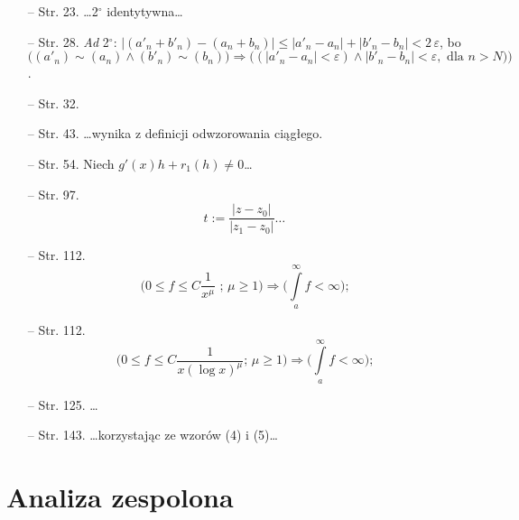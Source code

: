 \documentclass[a4paper,11pt]{article}
\begin{document}
\begin{itemize}
\item[--] Str. 23. \ldots 2$^{ \circ }$ identytywna\ldots
\item[--] Str. 28. \emph{Ad} 2$^{ \circ }$: $| ( a'_{ n } + b'_{ n } ) - ( a_{ n } + b_{ n } ) |  \leq | a'_{ n } - a_{ n } | + | b'_{ n } - b_{ n } | <2 \, \varepsilon$, bo\\
  $\big( ( a'_{ n } ) \sim ( a_{ n } ) \wedge( b'_{ n } ) \sim ( b_{ n
  } ) \big) \Rightarrow \big( ( | a'_{ n } - a_{ n } | < \varepsilon )
  \wedge | b'_{ n } - b_{ n } | <\varepsilon, \textrm{ dla } n > N )
  \big)$.
\item[--] Str. 32.
\item[--] Str. 43. \ldots wynika z definicji odwzorowania ciągłego.
\item[--] Str. 54. Niech $g'( x ) h + r_{ 1 }( h ) \neq 0$\ldots
\item[--] Str.
  97.$$t := \frac{ | z - z_{ 0 } | }{ | z_{ 1 } - z_{ 0 } | }
  \textrm{\ldots}$$
\item[--] Str. 112.
  $$\big( 0 \leq f \leq C \frac{ 1 }{ x^{ \mu } } \textrm{ ; } \mu
  \geq 1 \big) \Rightarrow \big( \int \limits^{ \infty }_{ a } f <
  \infty \big) \textrm{;}$$
\item[--] Str. 112.
  $$\big( 0 \leq f \leq C \frac{ 1 }{ x ( \log x )^{ \mu } } \textrm{
    ; } \mu \geq 1 \big) \Rightarrow \big( \int \limits^{ \infty }_{ a
  } f < \infty \big) \textrm{;}$$
\item[--] Str. 125. \ldots
\item[--] Str. 143. \ldots korzystając ze wzorów (4) i (5)\ldots
\end{itemize}






  






\newpage
\section{Analiza zespolona}
\end{document}
